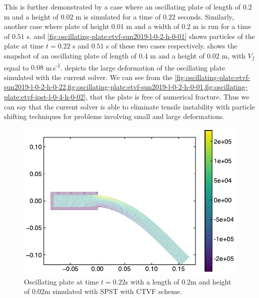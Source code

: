\documentclass[preprint,12pt]{elsarticle}
\begin{document}
This is further demonstrated by a case where an oscillating plate of length of
$0.2$ m and a height of $0.02$ m is simulated for a time of $0.22$ seconds.
Similarly, another case where plate of height $0.01$ m and a width of $0.2$ m
is run for a time of $0.51$ s.
 and
\cref{fig:oscillating-plate:etvf-sun2019-l-0-2-h-0-01} shows particles of the
plate at time $t=0.22$ s and $0.51$ s of these two cases respectively.
 shows the snapshot of an
oscillating plate of length of $0.4$ m and a height of $0.02$ m, with $V_f$
equal to $0.08$ m\,s\textsuperscript{-1}.
 depicts the large
deformation of the oscillating plate simulated with the current solver. We can
see from the
\cref{fig:oscillating-plate:etvf-sun2019-l-0-2-h-0-22,fig:oscillating-plate:etvf-sun2019-l-0-2-h-0-01,fig:oscillating-plate:etvf-ipst-l-0-4-h-0-02},
that the plate is free of numerical fracture. Thus we can say that the current
solver is able to eliminate tensile instability with particle shifting
techniques for problems involving small and large deformations.
%
%
\begin{figure}[!htpb]
  \centering
  \includegraphics[width=1\linewidth]{fig_19}
  \caption{Oscillating plate at time $t=0.22$s with a length of $0.2$m and
    height of $0.02$m simulated with SPST with CTVF scheme.}
\label{fig:oscillating-plate:etvf-sun2019-l-0-2-h-0-22}
\end{figure}
%
%
\end{document}
